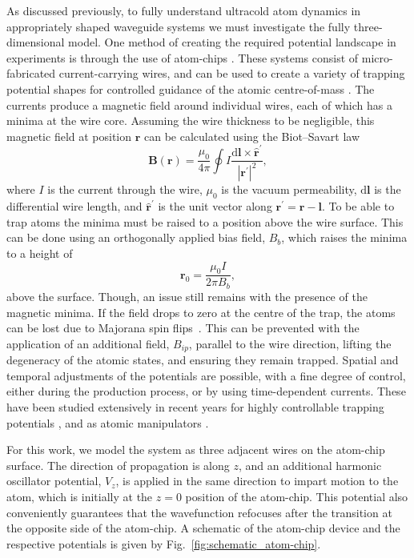 As discussed previously, to fully understand ultracold atom dynamics in appropriately shaped waveguide systems we must investigate the fully three-dimensional model. One method of creating the required potential landscape in experiments is through the use of atom-chips \cite{AO:Bartenstein_ieee_2000,AO:Folman_prl_2000}. These systems consist of micro-fabricated current-carrying wires, and can be used to create a variety of trapping potential shapes for controlled guidance of the atomic centre-of-mass \cite{AO:Denschlag_prl_1999}. The currents produce a magnetic field around individual wires, each of which has a minima at the wire core. Assuming the wire thickness to be negligible, this magnetic field at position $\mathbf{r}$ can be calculated using the Biot--Savart law
\begin{equation}
    \mathbf{B}(\mathbf{r}) = \frac{\mu_0}{4\pi}\oint I \frac{\text{d}\mathbf{l}\times \hat{\mathbf{r}}^{'}}{|\mathbf{r^{'}}|^2},
\end{equation}
where $I$ is the current through the wire, $\mu_0$ is the vacuum permeability, $\text{d}\mathbf{l}$ is the differential wire length, and $\hat{\mathbf{r}}^{'}$ is the unit vector along $\mathbf{r^{'}} = \mathbf{r} - \mathbf{l}$. To be able to trap atoms the minima must be raised to a position above the wire surface. This can be done using an orthogonally applied bias field, ${B}_b$, which raises the minima to a height of
\begin{equation}
    \mathbf{r}_0 = \frac{\mu_0 I}{2\pi {B}_b},
\end{equation}
above the surface. Though, an issue still remains with the presence of the magnetic minima. If the field drops to zero at the centre of the trap, the atoms can be lost due to Majorana spin flips~\cite{AO:Brink_pra_2006}. This can be prevented with the application of an additional field, ${B}_{ip}$, parallel to the wire direction, lifting the degeneracy of the atomic states, and ensuring they remain trapped. Spatial and temporal adjustments of the potentials are possible, with a fine degree of control, either during the production process, or by using time-dependent currents. These have been studied extensively in recent years for highly controllable trapping potentials \cite{AO:Yun_optexp_2006,AO:Gallego_optlett_2009}, and as atomic manipulators \cite{AO:Bensky_qip_2011}.

For this work, we model the system as three adjacent wires on the atom-chip surface. The direction of propagation is along $z$, and an additional harmonic oscillator potential, $V_z$, is applied in the same direction to impart motion to the atom, which is initially at the $z=0$ position of the atom-chip. This potential also conveniently guarantees that the wavefunction refocuses after the transition at the opposite side of the atom-chip. A schematic of the atom-chip device and the respective potentials is given by Fig.~\ref{fig:schematic_atom-chip}.

